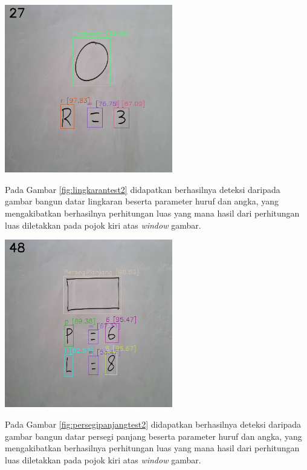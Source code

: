 \begin{center}
	\includegraphics[width=0.55\textwidth]{gambar/lingkaran2.png}
	\label{fig:lingkarantest2}
\end{center}
Pada Gambar \ref{fig:lingkarantest2} didapatkan berhasilnya deteksi daripada gambar bangun datar lingkaran beserta parameter huruf dan angka, yang mengakibatkan berhasilnya perhitungan luas yang mana hasil dari perhitungan luas diletakkan pada pojok kiri atas \textit{window} gambar.

\begin{center}
	\includegraphics[width=0.55\textwidth]{gambar/persegi panjang2.png}
	\label{fig:persegipanjangtest2}
\end{center}
Pada Gambar \ref{fig:persegipanjangtest2} didapatkan berhasilnya deteksi daripada gambar bangun datar persegi panjang beserta parameter huruf dan angka, yang mengakibatkan berhasilnya perhitungan luas yang mana hasil dari perhitungan luas diletakkan pada pojok kiri atas \textit{window} gambar.


